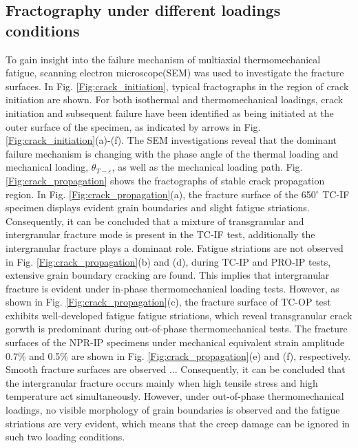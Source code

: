 \documentclass[preprint,5p,twocolumn,11pt,sort&compress]{elsarticle}
\begin{document}
\subsection{Fractography under different loadings conditions}


To gain insight into the failure mechanism of multiaxial thermomechanical fatigue, scanning electron microscope(SEM) was used to investigate the fracture surfaces. In Fig. \ref{Fig:crack_initiation}, typical fractographs in the region of crack initiation are shown. For both isothermal and thermomechanical loadings, crack initiation and subsequent failure have been identified as being initiated at the outer surface of the specimen, as indicated by arrows in Fig. \ref{Fig:crack_initiation}(a)-(f). The SEM investigations reveal that the dominant failure mechanism is changing with the phase angle of the thermal loading and mechanical loading, $\theta_{T-\varepsilon}$, as well as the mechanical loading path. 
Fig. \ref{Fig:crack_propagation} shows the fractographs of stable crack propagation region.
In Fig. \ref{Fig:crack_propagation}(a), the fracture surface of the 650$^\circ$ TC-IF specimen displays evident grain boundaries and slight fatigue striations. Consequently, it can be concluded that a mixture of transgranular and intergranular fracture mode is present in the TC-IF test, additionally the intergranular fracture plays a dominant role.
Fatigue striations are not observed in Fig. \ref{Fig:crack_propagation}(b) and (d), during TC-IP and PRO-IP tests, extensive grain boundary cracking are found. This implies that intergranular fracture is evident under in-phase thermomechanical loading tests.
However, as shown in Fig. \ref{Fig:crack_propagation}(c), the fracture surface of TC-OP test exhibits well-developed fatigue fatigue striations, which reveal transgranular crack gorwth is predominant during out-of-phase thermomechanical tests. 
The fracture surfaces of the NPR-IP specimens under mechanical equivalent strain amplitude 0.7\% and 0.5\% are shown in Fig. \ref{Fig:crack_propagation}(e) and (f), respectively. Smooth fracture surfaces are observed ...
Consequently, it can be concluded that the intergranular fracture occurs mainly when high tensile stress and high temperature act simultaneously. However, under out-of-phase thermomechanical loadings, no visible morphology of grain boundaries is observed and the fatigue striations are very evident, which means that the creep damage can be ignored in such two loading conditions.
\end{document}
